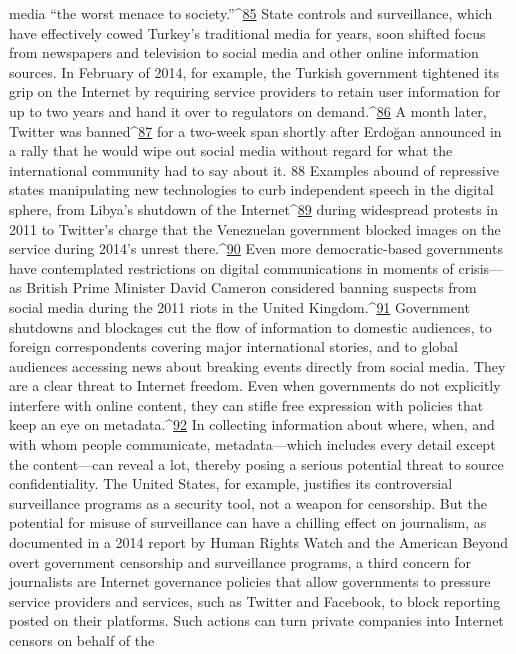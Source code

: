media ``the worst menace to society.''^{\href{#endnotes}{85}} State controls and surveillance, which have
effectively cowed Turkey’s traditional media for years, soon shifted focus from
newspapers and television to social media and other online information sources. In
February of 2014, for example, the Turkish government tightened its grip on the Internet
by requiring service providers to retain user information for up to two years and hand it
over to regulators on demand.^{\href{#endnotes}{86}} A month later, Twitter was banned^{\href{#endnotes}{87}} for a two-week span
shortly after Erdoğan announced in a rally that he would wipe out social media without
regard for what the international community had to say about it. 88
Examples abound of repressive states manipulating new technologies to curb independent
speech in the digital sphere, from Libya’s shutdown of the Internet^{\href{#endnotes}{89}} during widespread
protests in 2011 to Twitter’s charge that the Venezuelan government blocked images on
the service during 2014’s unrest there.^{\href{#endnotes}{90}} Even more democratic-based governments have
contemplated restrictions on digital communications in moments of crisis—as British
Prime Minister David Cameron considered banning suspects from social media during
the 2011 riots in the United Kingdom.^{\href{#endnotes}{91}}
Government shutdowns and blockages cut the flow of information to domestic audiences,
to foreign correspondents covering major international stories, and to global audiences
accessing news about breaking events directly from social media. They are a clear threat
to Internet freedom. Even when governments do not explicitly interfere with online
content, they can stifle free expression with policies that keep an eye on metadata.^{\href{#endnotes}{92}} In
collecting information about where, when, and with whom people communicate,
metadata—which includes every detail except the content—can reveal a lot, thereby
posing a serious potential threat to source confidentiality. The United States, for example,
justifies its controversial surveillance programs as a security tool, not a weapon for
censorship. But the potential for misuse of surveillance can have a chilling effect on
journalism, as documented in a 2014 report by Human Rights Watch and the American
Beyond overt government censorship and surveillance programs, a third concern for
journalists are Internet governance policies that allow governments to pressure service
providers and services, such as Twitter and Facebook, to block reporting posted on their
platforms. Such actions can turn private companies into Internet censors on behalf of the
